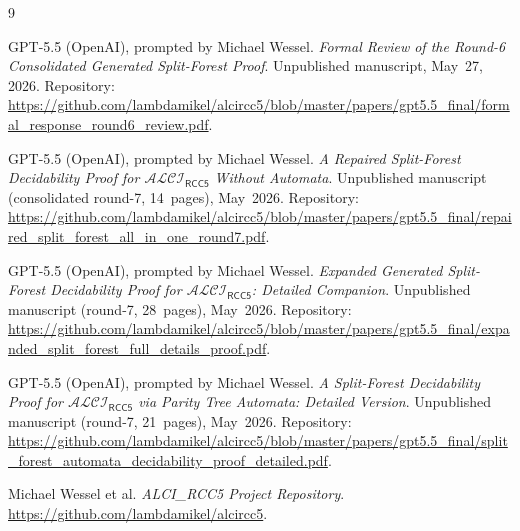 \documentclass[11pt]{article}
\theoremstyle{definition}
\theoremstyle{remark}
\newcommand{\ALCIRCC}[1]{\mathcal{ALCI}_{\mathsf{RCC#1}}}
\begin{document}
\begin{thebibliography}{9}

GPT-5.5 (OpenAI), prompted by Michael Wessel.
\emph{Formal Review of the Round-6 Consolidated Generated
Split-Forest Proof}.  Unpublished manuscript, May~27, 2026.
Repository:
\url{https://github.com/lambdamikel/alcircc5/blob/master/papers/gpt5.5_final/formal_response_round6_review.pdf}.

GPT-5.5 (OpenAI), prompted by Michael Wessel.
\emph{A Repaired Split-Forest Decidability Proof for $\ALCIRCC{5}$
Without Automata}.  Unpublished manuscript (consolidated round-7,
14~pages), May~2026.  Repository:
\url{https://github.com/lambdamikel/alcircc5/blob/master/papers/gpt5.5_final/repaired_split_forest_all_in_one_round7.pdf}.

GPT-5.5 (OpenAI), prompted by Michael Wessel.
\emph{Expanded Generated Split-Forest Decidability Proof for
$\ALCIRCC{5}$: Detailed Companion}.  Unpublished manuscript
(round-7, 28~pages), May~2026.  Repository:
\url{https://github.com/lambdamikel/alcircc5/blob/master/papers/gpt5.5_final/expanded_split_forest_full_details_proof.pdf}.

GPT-5.5 (OpenAI), prompted by Michael Wessel.
\emph{A Split-Forest Decidability Proof for $\ALCIRCC{5}$ via Parity
Tree Automata: Detailed Version}.  Unpublished manuscript (round-7,
21~pages), May~2026.  Repository:
\url{https://github.com/lambdamikel/alcircc5/blob/master/papers/gpt5.5_final/split_forest_automata_decidability_proof_detailed.pdf}.

Michael Wessel et al.
\emph{ALCI\_RCC5 Project Repository}.
\url{https://github.com/lambdamikel/alcircc5}.

\end{thebibliography}
\end{document}
